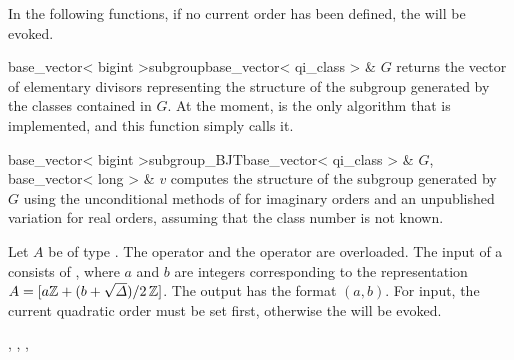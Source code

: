 

In the following functions, if no current order has been defined, the \LEH will be evoked.

\begin{fcode}{base_vector< bigint >}{subgroup}{base_vector< qi_class > & $G$}
  returns the vector of elementary divisors representing the structure of the subgroup generated
  by the classes contained in $G$.  At the moment,  is the only algorithm
  that is implemented, and this function simply calls it.
\end{fcode}

\begin{fcode}{base_vector< bigint >}{subgroup_BJT}{base_vector< qi_class > & $G$,
    base_vector< long > & $v$}%
  computes the structure of the subgroup generated by $G$ using the unconditional methods of
  \cite{Buchmann/Jabobson/Teske:1997} for imaginary orders and an unpublished variation for real
  orders, assuming that the class number is not known.
\end{fcode}




\IO

Let $A$ be of type .  The  operator \code{>>} and the
 operator \code{<<} are overloaded.  The input of a  consists of
, where $a$ and $b$ are integers corresponding to the representation $A = [a \mathbb{Z} +
(b + \sqrt{\varDelta})/2 \, \mathbb{Z} ]$.  The output has the format $(a,b)$.  For input, the current
quadratic order must be set first, otherwise the \LEH will be evoked.



\SEEALSO

,
,
,



